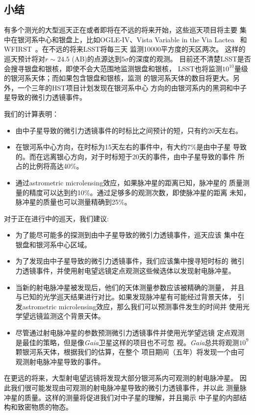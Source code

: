 \subsection{小结}

有多个测光的大型巡天正在或者即将在不远的将来开始，这些巡天项目将主要
集中在银河系中心和银盘上，比如OGLE-IV、Vista Variable in the Via Lactea~\supercite{Minniti} 
和WFIRST~\supercite{Spergel}。在不远的将来LSST\supercite{ivez}将每三天
监测10000平方度的天区两次。
这样的巡天预计将对$r\sim24.5$ (AB)的点源达到$5\sigma$的深度的观测。
目前还不清楚LSST是否会搜寻银盘和银核，即使不会大范围地监测银盘和银核，
LSST也将监测$10^{10}$量级的银河系天体；而如果包含银盘和银核，监测
的银河系天体的数目将更大。另外，一个三年的HST项目计划发现在银河系中心
方向的由银河系内的黑洞和中子星导致的微引力透镜事件\supercite{sahu}。

我们的计算表明：
\begin{itemize}
\item 由中子星导致的微引力透镜事件的时标比之间预计的短，只有约20天左右。
\item 在银河系中心方向，在时标为15天左右的事件中，有大约7\%是由中子星
导致的。而在远离银心方向，对于时标短于20天的事件，由中子星导致的事件
所占的比例将高达40\%。
\item 通过astrometric microlensing效应，如果脉冲星的距离已知，脉冲星的
质量测量的精度可以达到约10\%。通过足够多的观测次数，即使脉冲星的距离
未知，脉冲星的质量也可以测量精确到25\%。
\end{itemize}

对于正在进行中的巡天，我们建议:
\begin{itemize}
\item 为了能尽可能多的探测到由中子星导致的微引力透镜事件，巡天应该
集中在银盘和银河系中心区域。
\item 为了发现由中子星导致的微引力透镜事件，我们应该集中搜寻短时标的
微引力透镜事件，并使用射电望远镜定点观测这些候选体以发现射电脉冲星。
\item 当新的射电脉冲星被发现后，他们的天体测量参数应该被精确的测量，
并且与已知的光学巡天结果进行对比。如果发现脉冲星有可能经过背景天体，
引发astrometric microlensing效应，那么我们可以预测事件发生的时间并
使用光学望远镜监测这个背景天体。
\item 尽管通过射电脉冲星的参数预测微引力透镜事件并使用光学望远镜
定点观测是最佳的策略，但是像\textit{Gaia}卫星这样的项目也不可忽
视。\textit{Gaia}总共将观测$10^9$颗银河系天体，根据我们的估算，在整个
项目期间（五年）将发现一个由可观测射电脉冲星导致的事件。
\end{itemize}

在更远的将来，大型射电望远镜将发现大部分银河系内可观测的射电脉冲星。
因此我们很可能发现由可观测的射电脉冲星导致的微引力透镜事件，并以此
测量脉冲星的质量。这样的测量将促进我们对中子星的理解，并且揭示
中子星的内部结构和致密物质的物态。

\pkuthssffaq

